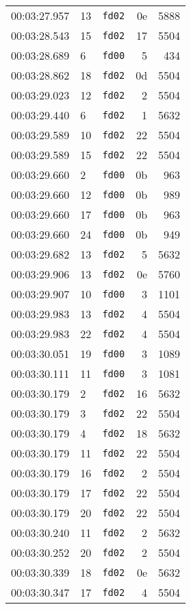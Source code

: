 \documentclass{article}
\begin{document}
\begin{longtable}{lllrr}
00:03:27.957 & 13 & \texttt{fd02} & 0e & 5888 \\
00:03:28.543 & 15 & \texttt{fd02} & 17 & 5504 \\
00:03:28.689 & 6 & \texttt{fd00} & 5 & 434 \\
00:03:28.862 & 18 & \texttt{fd02} & 0d & 5504 \\
00:03:29.023 & 12 & \texttt{fd02} & 2 & 5504 \\
00:03:29.440 & 6 & \texttt{fd02} & 1 & 5632 \\
00:03:29.589 & 10 & \texttt{fd02} & 22 & 5504 \\
00:03:29.589 & 15 & \texttt{fd02} & 22 & 5504 \\
00:03:29.660 & 2 & \texttt{fd00} & 0b & 963 \\
00:03:29.660 & 12 & \texttt{fd00} & 0b & 989 \\
00:03:29.660 & 17 & \texttt{fd00} & 0b & 963 \\
00:03:29.660 & 24 & \texttt{fd00} & 0b & 949 \\
00:03:29.682 & 13 & \texttt{fd02} & 5 & 5632 \\
00:03:29.906 & 13 & \texttt{fd02} & 0e & 5760 \\
00:03:29.907 & 10 & \texttt{fd00} & 3 & 1101 \\
00:03:29.983 & 13 & \texttt{fd02} & 4 & 5504 \\
00:03:29.983 & 22 & \texttt{fd02} & 4 & 5504 \\
00:03:30.051 & 19 & \texttt{fd00} & 3 & 1089 \\
00:03:30.111 & 11 & \texttt{fd00} & 3 & 1081 \\
00:03:30.179 & 2 & \texttt{fd02} & 16 & 5632 \\
00:03:30.179 & 3 & \texttt{fd02} & 22 & 5504 \\
00:03:30.179 & 4 & \texttt{fd02} & 18 & 5632 \\
00:03:30.179 & 11 & \texttt{fd02} & 22 & 5504 \\
00:03:30.179 & 16 & \texttt{fd02} & 2 & 5504 \\
00:03:30.179 & 17 & \texttt{fd02} & 22 & 5504 \\
00:03:30.179 & 20 & \texttt{fd02} & 22 & 5504 \\
00:03:30.240 & 11 & \texttt{fd02} & 2 & 5632 \\
00:03:30.252 & 20 & \texttt{fd02} & 2 & 5504 \\
00:03:30.339 & 18 & \texttt{fd02} & 0e & 5632 \\
00:03:30.347 & 17 & \texttt{fd02} & 4 & 5504 \\

\end{longtable}
\end{document}
